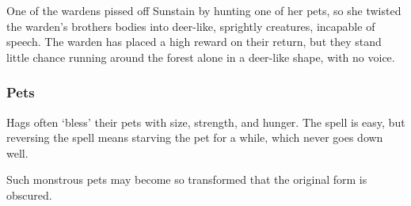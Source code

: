 \begin{multicols}{2}
\begin{itemize}
  One of the \glspl{warden} pissed off Sunstain by hunting one of her pets, so she twisted the \gls{warden}'s brothers bodies into deer-like, sprightly creatures, incapable of speech.
  The \gls{warden} has placed a high reward on their return, but they stand little chance running around the forest alone in a deer-like shape, with no voice.
\end{itemize}

\subsubsection{Pets}

Hags often `bless' their pets with size, strength, and hunger.
The spell is easy, but reversing the spell means starving the pet for a while, which never goes down well.

\ifodd\value{r2}
\else
\fi

Such monstrous pets may become so transformed that the original form is obscured.

\end{multicols}
